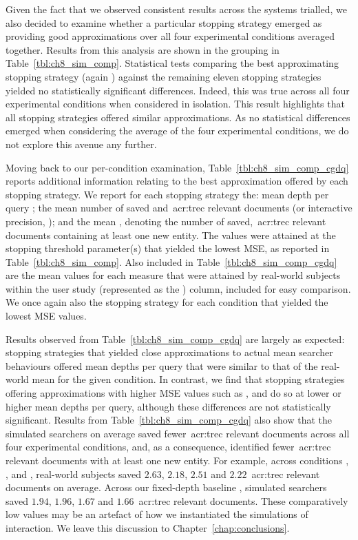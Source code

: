 Given the fact that we observed consistent results across the systems trialled, we also decided to examine whether a particular stopping strategy emerged as providing good approximations over all four experimental conditions averaged together. Results from this analysis are shown in the  grouping in Table~\ref{tbl:ch8_sim_comp}. Statistical tests comparing the best approximating stopping strategy (again ) against the remaining eleven stopping strategies yielded no statistically significant differences. Indeed, this was true across all four experimental conditions when considered in isolation. This result highlights that all stopping strategies offered similar approximations. As no statistical differences emerged when considering the average of the four experimental conditions, we do not explore this avenue any further.

Moving back to our per-condition examination, Table~\ref{tbl:ch8_sim_comp_cgdq} reports additional information relating to the best approximation offered by each stopping strategy. We report for each stopping strategy the: mean depth per query ; the mean number of saved and~\gls{acr:trec} relevant documents (or interactive precision, ); and the mean , denoting the number of saved,~\gls{acr:trec} relevant documents containing at least one new entity. The values were attained at the stopping threshold parameter(s) that yielded the lowest MSE, as reported in Table~\ref{tbl:ch8_sim_comp}. Also included in Table~\ref{tbl:ch8_sim_comp_cgdq} are the mean values for each measure that were attained by real-world subjects within the user study (represented as the ) column, included for easy comparison. We once again also  the stopping strategy for each condition that yielded the lowest MSE values.

Results observed from Table~\ref{tbl:ch8_sim_comp_cgdq} are largely as expected: stopping strategies that yielded close approximations to actual mean searcher behaviours offered mean depths per query that were similar to that of the real-world mean for the given condition. In contrast, we find that stopping strategies offering approximations with higher MSE values such as ,  and  do so at lower or higher mean depths per query, although these differences are not statistically significant. Results from Table~\ref{tbl:ch8_sim_comp_cgdq} also show that the simulated searchers on average saved fewer~\gls{acr:trec} relevant documents across all four experimental conditions, and, as a consequence, identified fewer~\gls{acr:trec} relevant documents with at least one new entity. For example, across conditions , ,  and , real-world subjects saved $2.63$, $2.18$, $2.51$ and $2.22$~\gls{acr:trec} relevant documents on average. Across our fixed-depth baseline , simulated searchers saved $1.94$, $1.96$, $1.67$ and $1.66$~\gls{acr:trec} relevant documents. These comparatively low values may be an artefact of how we instantiated the simulations of interaction. We leave this discussion to Chapter~\ref{chap:conclusions}.

